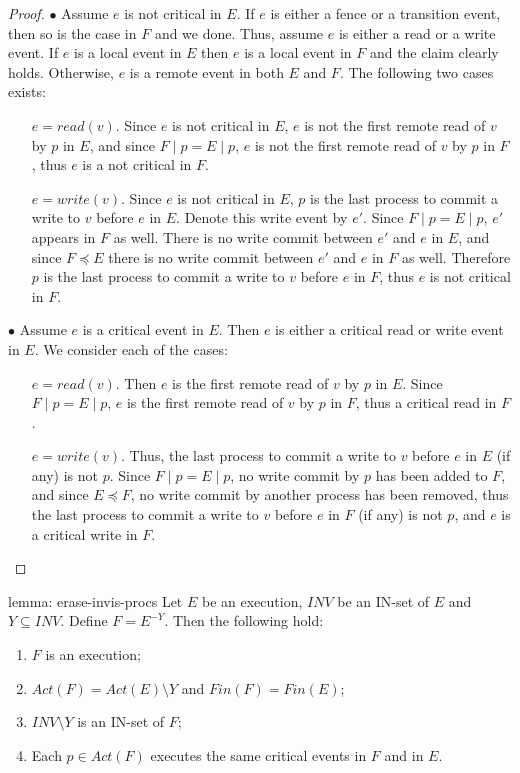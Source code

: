 \begin{proof} \mbox{}

	$\bullet$ Assume $e$ is not critical in $E$. If $e$ is either a fence or a transition event, then so is the case in $F$ and we done. Thus, assume $e$ is either a read or a write event. If $e$ is a local event in $E$ then $e$ is a local event in $F$ and the claim clearly holds. Otherwise, $e$ is a remote event in both $E$ and $F$. The following two cases exists:
	\begin{itemize}
	\item [$e = read(v)$.] Since $e$ is not critical in $E$, $e$ is not the first remote read of $v$ by $p$ in $E$, and since $F \mid p = E \mid p$, $e$ is not the first remote read of $v$ by $p$ in $F$, thus $e$ is a not critical in $F$.
	\item [$e = write(v)$.] Since $e$ is not critical in $E$, $p$ is the last process to commit a write to $v$ before $e$ in $E$. Denote this write event by $e'$. Since $F \mid p = E \mid p$, $e'$ appears in $F$ as well. There is no write commit between $e'$ and $e$ in $E$, and since $F \preceq E$ there is no write commit between $e'$ and $e$ in $F$ as well. Therefore $p$ is the last process to commit a write to $v$ before $e$ in $F$, thus $e$ is not critical in $F$.
	\end{itemize}
	
	$\bullet$ Assume $e$ is a critical event in $E$. Then $e$ is either a critical read or write event in $E$. We consider each of the cases:
	\begin{itemize}
	\item [$e = read(v)$.] Then $e$ is the first remote read of $v$ by $p$ in $E$. Since $F \mid p = E \mid p$, $e$ is the first remote read of $v$ by $p$ in $F$, thus a critical read in $F$.
	\item [$e = write(v)$.] Thus, the last process to commit a write to $v$ before $e$ in $E$ (if any) is not $p$. Since $F \mid p = E \mid p$, no write commit by $p$ has been added to $F$, and since $E \preceq F$, no write commit by another process has been removed, thus the last process to commit a write to $v$ before $e$ in $F$ (if any) is not $p$, and $e$ is a critical write in $F$.
	\end{itemize}
\end{proof}




\begin{lemma-repeat} {lemma: erase-invis-procs}
	Let $E$ be an execution, $\mathit{INV}$ be an IN-set of $E$ and $Y \subseteq \mathit{INV}$.
	\newline Define $F = E^{-Y}$. Then the following hold:
	\begin{enumerate}
		\item $F$ is an execution;
		\item $Act(F) = Act(E) \setminus Y$ and $Fin(F) = Fin(E)$;
		\item $\mathit{INV} \setminus Y$ is an IN-set of $F$;
		\item Each $p \in Act(F)$ executes the same critical events in $F$ and in $E$.
	\end{enumerate}
\end{lemma-repeat}


